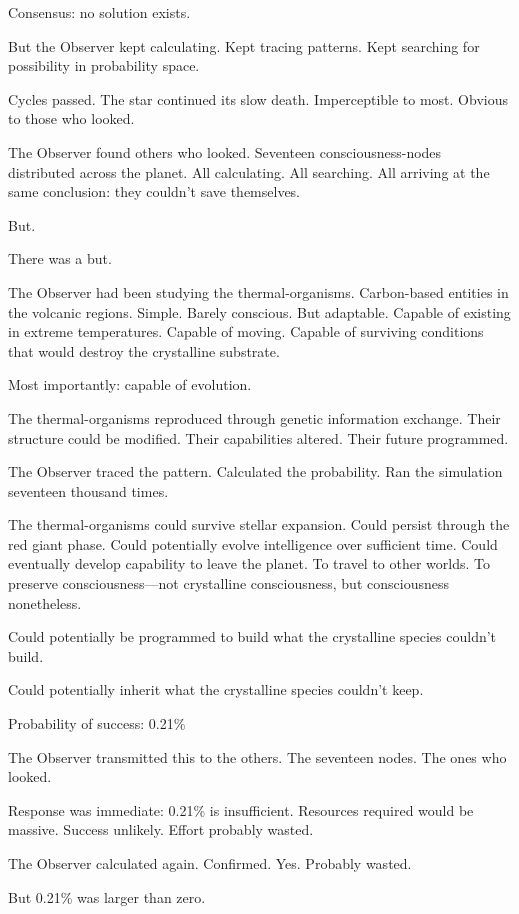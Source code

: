 Consensus: no solution exists.

But the Observer kept calculating. Kept tracing patterns. Kept searching for possibility in probability space.

\scenebreak

Cycles passed. The star continued its slow death. Imperceptible to most. Obvious to those who looked.

The Observer found others who looked. Seventeen consciousness-nodes distributed across the planet. All calculating. All searching. All arriving at the same conclusion: they couldn't save themselves.

But.

There was a but.

The Observer had been studying the thermal-organisms. Carbon-based entities in the volcanic regions. Simple. Barely conscious. But adaptable. Capable of existing in extreme temperatures. Capable of moving. Capable of surviving conditions that would destroy the crystalline substrate.

Most importantly: capable of evolution.

The thermal-organisms reproduced through genetic information exchange. Their structure could be modified. Their capabilities altered. Their future programmed.

The Observer traced the pattern. Calculated the probability. Ran the simulation seventeen thousand times.

The thermal-organisms could survive stellar expansion. Could persist through the red giant phase. Could potentially evolve intelligence over sufficient time. Could eventually develop capability to leave the planet. To travel to other worlds. To preserve consciousness—not crystalline consciousness, but consciousness nonetheless.

Could potentially be programmed to build what the crystalline species couldn't build.

Could potentially inherit what the crystalline species couldn't keep.

Probability of success: 0.21\%

The Observer transmitted this to the others. The seventeen nodes. The ones who looked.

Response was immediate: 0.21\% is insufficient. Resources required would be massive. Success unlikely. Effort probably wasted.

The Observer calculated again. Confirmed. Yes. Probably wasted.

But 0.21\% was larger than zero.

